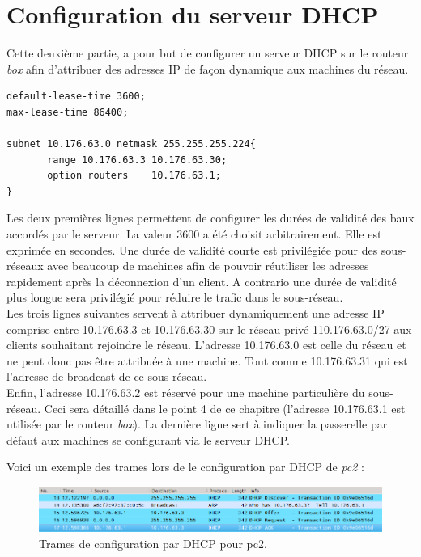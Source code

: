 \documentclass[12pt,a4paper,utf8x]{report}
\begin{document}
\section{Configuration du serveur DHCP}
Cette deuxième partie, a pour but de configurer un serveur DHCP sur le routeur \emph{box} afin d'attribuer des adresses IP de façon dynamique aux machines du réseau.
\label{lbl1}
\begin{verbatim}
default-lease-time 3600;
max-lease-time 86400;

subnet 10.176.63.0 netmask 255.255.255.224{
       range 10.176.63.3 10.176.63.30;
       option routers    10.176.63.1;
}
\end{verbatim}
Les deux premières lignes permettent de configurer les durées de validité des baux accordés par le serveur.
La valeur 3600 a été choisit arbitrairement. Elle est exprimée en secondes. Une durée de validité courte est privilégiée pour des sous-réseaux avec beaucoup de machines afin de pouvoir réutiliser les adresses rapidement après la déconnexion d'un client. A contrario une durée de validité plus longue sera privilégié pour réduire le trafic dans le sous-réseau.\\
Les trois lignes suivantes servent à attribuer dynamiquement une adresse IP comprise entre 10.176.63.3 et 10.176.63.30 sur le réseau privé 110.176.63.0/27 aux clients souhaitant rejoindre le réseau.
L'adresse 10.176.63.0 est celle du réseau et ne peut donc pas être attribuée à une machine. Tout comme 10.176.63.31 qui est l'adresse de broadcast de ce sous-réseau.\\
Enfin, l'adresse 10.176.63.2 est réservé pour une machine particulière du sous-réseau. Ceci sera détaillé dans le point 4 de ce chapitre (l'adresse 10.176.63.1 est utilisée par le routeur \emph{box}).
La dernière ligne sert à indiquer la passerelle par défaut aux machines se configurant via le serveur DHCP.

Voici un exemple des trames lors de le configuration par DHCP de \emph{pc2} :

\begin{figure}[h!]

	\includegraphics[width=1\textwidth]{TrameDHCP.png}
	\centering
	\caption{Trames de configuration par DHCP pour pc2.}

\end{figure}
\end{document}
